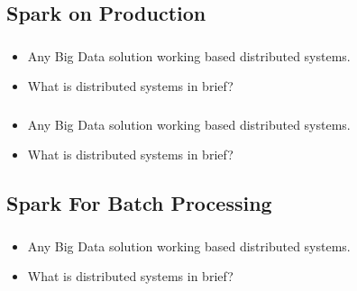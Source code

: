 \subsection{Spark on Production}

\begin{frame}
  \frametitle{\subsecname}
	\begin{itemize}[<+->]
		\item Any Big Data solution working based distributed systems.
		\item What is distributed systems in brief?
	\end{itemize}
\end{frame}


\begin{frame}
  \frametitle{\subsecname}
	\begin{itemize}[<+->]
		\item Any Big Data solution working based distributed systems.
		\item What is distributed systems in brief?
	\end{itemize}
\end{frame}


\subsection{Spark For Batch Processing}

\begin{frame}
  \frametitle{\subsecname}
	\begin{itemize}[<+->]
		\item Any Big Data solution working based distributed systems.
		\item What is distributed systems in brief?
	\end{itemize}
\end{frame}

